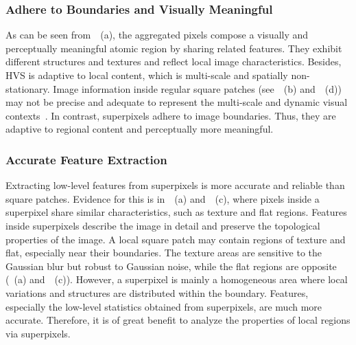 		\subsubsection{Adhere to Boundaries and Visually Meaningful}\label{Adhere to Boundaries and Visually Meaningful}
		As can be seen from~~(a), the aggregated pixels compose a visually and perceptually meaningful atomic region by sharing related features. They exhibit different structures and textures and reflect local image characteristics. Besides, HVS is adaptive to local content, which is multi-scale and spatially non-stationary. Image information inside regular square patches (see~~(b) and~~(d)) may not be precise and adequate to represent the multi-scale and dynamic visual contexts~\citep{sun2018spsim}. In contrast, superpixels adhere to image boundaries. Thus, they are adaptive to regional content and perceptually more meaningful.
		
		\subsubsection{Accurate Feature Extraction}\label{Accurate Feature Extraction}
		Extracting low-level features from superpixels is more accurate and reliable than square patches. Evidence for this is in~~(a) and~~(c), where pixels inside a superpixel share similar characteristics, such as texture and flat regions. Features inside superpixels describe the image in detail and preserve the topological properties of the image. A local square patch may contain regions of texture and flat, especially near their boundaries. The texture areas are sensitive to the Gaussian blur but robust to Gaussian noise, while the flat regions are opposite (~(a) and~~(c)). However, a superpixel is mainly a homogeneous area where local variations and structures are distributed within the boundary. Features, especially the low-level statistics obtained from superpixels, are much more accurate. Therefore, it is of great benefit to analyze the properties of local regions via superpixels.
	
